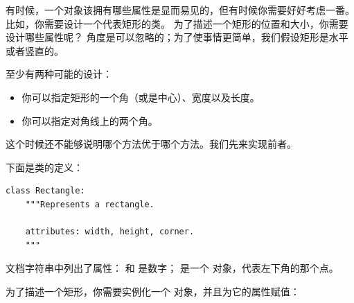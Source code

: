 有时候，一个对象该拥有哪些属性是显而易见的，但有时候你需要好好考虑一番。
比如，你需要设计一个代表矩形的类。
为了描述一个矩形的位置和大小，你需要设计哪些属性呢？
角度是可以忽略的；为了使事情更简单，我们假设矩形是水平或者竖直的。



至少有两种可能的设计：

\begin{itemize}


\item 你可以指定矩形的一个角（或是中心）、宽度以及长度。

\item 你可以指定对角线上的两个角。

\end{itemize}


这个时候还不能够说明哪个方法优于哪个方法。我们先来实现前者。

  


下面是类的定义：

\begin{lstlisting}
class Rectangle:
    """Represents a rectangle.

    attributes: width, height, corner.
    """
\end{lstlisting}

%

文档字符串中列出了属性：  和  是数字；
 是一个  对象，代表左下角的那个点。


为了描述一个矩形，你需要实例化一个  对象，并且为它的属性赋值：

